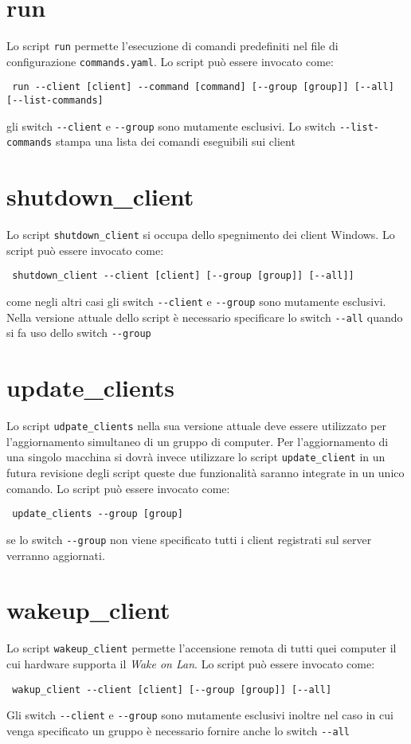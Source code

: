\documentclass[a4paper,10pt,oneside]{memoir}
\begin{document}
\section*{run}
Lo script \verb#run# permette l'esecuzione di comandi predefiniti nel file di configurazione \verb#commands.yaml#. Lo script può essere invocato come:
\begin{verbatim}
 run --client [client] --command [command] [--group [group]] [--all] [--list-commands]
\end{verbatim}
gli switch \verb#--client# e \verb#--group# sono mutamente esclusivi. Lo switch \verb#--list-commands# stampa una lista dei comandi eseguibili sui client
\section*{shutdown\_client}
Lo script \verb#shutdown_client# si occupa dello spegnimento dei client Windows. Lo script può essere invocato come:

\begin{verbatim}
 shutdown_client --client [client] [--group [group]] [--all]]
\end{verbatim}
come negli altri casi gli switch \verb#--client# e \verb#--group# sono mutamente esclusivi. Nella versione attuale dello script è necessario specificare lo switch \verb#--all# quando si fa uso dello switch \verb#--group#

\section*{update\_clients}

Lo script \verb#udpate_clients# nella sua versione attuale deve essere utilizzato per l'aggiornamento simultaneo di un gruppo di computer. Per l'aggiornamento di una singolo macchina si dovrà invece utilizzare lo script \verb#update_client# in un futura revisione degli script queste due funzionalità saranno integrate in un unico comando. Lo script può essere invocato come:
\begin{verbatim}
 update_clients --group [group]
\end{verbatim}
se lo switch \verb#--group# non viene specificato tutti i client registrati sul server verranno aggiornati.

\section*{wakeup\_client}

Lo script \verb#wakeup_client# permette l'accensione remota di tutti quei computer il cui hardware supporta il \emph{Wake on Lan}. Lo script può essere invocato come:
\begin{verbatim}
 wakup_client --client [client] [--group [group]] [--all]
\end{verbatim}
Gli switch \verb#--client# e \verb#--group# sono mutamente esclusivi inoltre nel caso in cui venga specificato un gruppo è necessario fornire anche lo switch \verb#--all#
\end{document}
